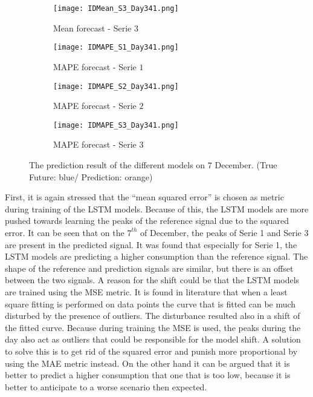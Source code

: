 \begin{figure}[ht]
	\begin{subfigure}{0.32\textwidth}
		\texttt{[image: IDMean\_S3\_Day341.png]}
		\caption{Mean forecast - Serie $ 3 $}
	\end{subfigure}
	 \begin{subfigure}{0.32\textwidth}
		\texttt{[image: IDMAPE\_S1\_Day341.png]}
		\caption{MAPE forecast - Serie $ 1 $}
	\end{subfigure}	 	
	\begin{subfigure}{0.32\textwidth}
		\texttt{[image: IDMAPE\_S2\_Day341.png]}
		\caption{MAPE forecast - Serie $ 2 $}
	\end{subfigure}	
	\begin{subfigure}{0.32\textwidth}
		\texttt{[image: IDMAPE\_S3\_Day341.png]}
		\caption{MAPE forecast - Serie $ 3 $}
	\end{subfigure}
 	\caption{The prediction result of the different models on $ 7 $ December. (True Future: blue/ Prediction: orange)}
 	\label{fig:individual_forecasts}
 \end{figure}


First, it is again stressed that the ``mean squared error'' is chosen as metric during training of the LSTM models. Because of this, the LSTM models are more pushed towards learning the peaks of the reference signal due to the squared error. It can be seen that on the $ 7^{th} $ of December, the peaks of Serie 1 and Serie 3 are present in the predicted signal. It was found that especially for Serie 1, the LSTM models are predicting a higher consumption than the reference signal. The shape of the reference and prediction signals are similar, but there is an offset between the two signals. A reason for the shift could be that the LSTM models are trained using the MSE metric. It is found in literature that when a least square fitting is performed on data points the curve that is fitted can be much disturbed by the presence of outliers. The disturbance resulted also in a shift of the fitted curve. Because during training the MSE is used, the peaks during the day also act as outliers that could be responsible for the model shift. A solution to solve this is to get rid of the squared error and punish more proportional by using the MAE metric instead. On the other hand it can be argued that it is better to predict a higher consumption that one that is too low, because it is better to anticipate to a worse scenario then expected.\\

